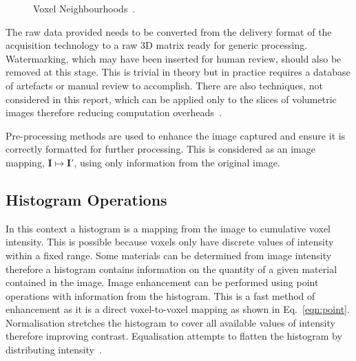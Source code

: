 \documentclass[journal]{IEEEtran}
\begin{document}
\begin{figure}[!htb]
	\centering
\caption{Voxel Neighbourhoods~\cite{lohmann1998volumetric}.}
\label{fig:neighbourhood}
\end{figure}


The raw data provided needs to be converted from the delivery format of the acquisition technology to a raw 3D matrix ready for generic processing.
Watermarking, which may have been inserted for human review, should also be removed at this stage. 
This is trivial in theory but in practice requires a database of artefacts or manual review to accomplish.
There are also techniques, not considered in this report, which can be applied only to the slices of volumetric images therefore reducing computation overheads~\cite{harauz86exact}.

Pre-processing methods are used to enhance the image captured and ensure it is correctly formatted for further processing.
This is considered as an image mapping, $\textbf{I} \mapsto \textbf{I}'$, using only information from the original image.

\subsection{Histogram Operations}

In this context a histogram is a mapping from the image to cumulative voxel intensity.
This is possible because voxels only have discrete values of intensity within a fixed range.
Some materials can be determined from image intensity therefore a histogram contains information on the quantity of a given material contained in the image.
Image enhancement can be performed using point operations with information from the histogram.
This is a fast method of enhancement as it is a direct voxel-to-voxel mapping as shown in Eq.~\eqref{eqn:point}. 
Normalisation stretches the histogram to cover all available values of intensity therefore improving contrast.
Equalisation attempts to flatten the histogram by distributing intensity~\cite{nixon02feature}.
\end{document}
